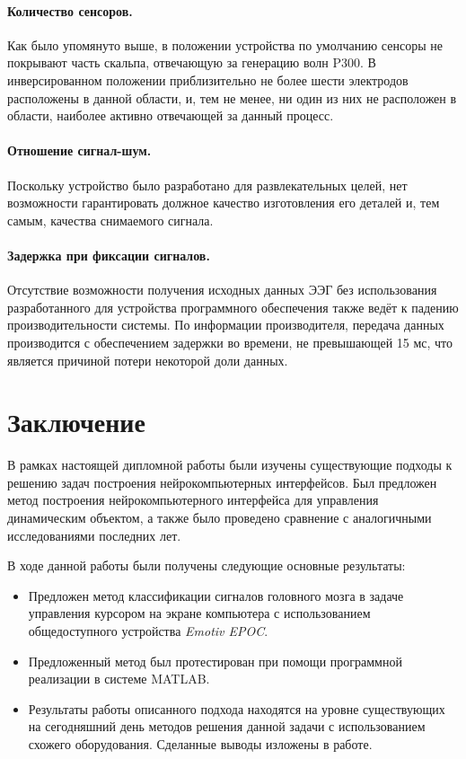 \documentclass[12pt,a4paper,oneside,fleqn,leqno]{article}
\begin{document}
	\paragraph{Количество сенсоров.}
	\par Как было упомянуто выше, в положении устройства по умолчанию сенсоры не покрывают часть скальпа, отвечающую за генерацию волн P300. В инверсированном положении приблизительно не более шести электродов расположены в данной области, и, тем не менее, ни один из них не расположен в области, наиболее активно отвечающей за данный процесс.
	\paragraph{Отношение сигнал-шум.}
	\par Поскольку устройство было разработано для развлекательных целей, нет возможности гарантировать должное качество изготовления его деталей и, тем самым, качества снимаемого сигнала.
	\paragraph{Задержка при фиксации сигналов.}
	\par Отсутствие возможности получения исходных данных ЭЭГ без использования разработанного для устройства программного обеспечения также ведёт к падению производительности системы. По информации производителя, передача данных производится с обеспечением задержки во времени, не превышающей 15 мс, что является причиной потери некоторой доли данных.
\newpage
\section{Заключение}
	\par В рамках настоящей дипломной работы были изучены существующие подходы к решению задач построения нейрокомпьютерных интерфейсов. Был предложен метод построения нейрокомпьютерного интерфейса для управления динамическим объектом, а также было проведено сравнение с аналогичными исследованиями последних лет.
	\par В ходе данной работы были получены следующие основные результаты:
	\begin{itemize}\itemsep0pt
		\item
		Предложен метод классификации сигналов головного мозга в задаче управления курсором на экране компьютера с использованием общедоступного устройства {\it Emotiv EPOC}.
		\item
		Предложенный метод был протестирован при помощи программной реализации в системе MATLAB.
		\item
		Результаты работы описанного подхода находятся на уровне существующих на сегодняшний день методов решения данной задачи с использованием схожего оборудования. Сделанные выводы изложены в работе.
	\end{itemize}\par
\end{document}

